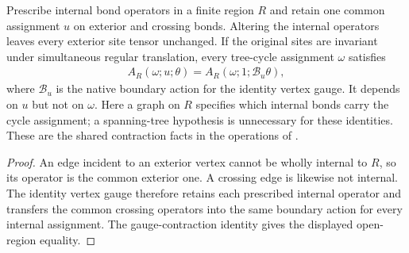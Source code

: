 \begin{lemma}%
    \label{lem:peps_regular_bond_extension_transport}
    \leanok
    Prescribe internal bond operators in a finite region $R$ and retain one
    common assignment $u$ on exterior and crossing bonds. Altering the internal
    operators leaves every exterior site tensor unchanged. If the original
    sites are invariant under simultaneous regular translation, every
    tree-cycle assignment $\omega$ satisfies
    \begin{align}
        A_R(\omega;u;\theta)
        =A_R(\omega;1;\mathcal B_u\theta),
    \end{align}
    where $\mathcal B_u$ is the native boundary action for the identity
    vertex gauge. It depends on $u$ but not on $\omega$. Here a graph on $R$
    specifies which internal bonds carry the cycle assignment; a spanning-tree
    hypothesis is unnecessary for these identities. These are the shared
    contraction facts in the operations of
    \cite[Theorems~6.16--6.17]{Schuch2010PEPS}.
\end{lemma}

\begin{proof}\leanok
    An edge incident to an exterior vertex cannot be wholly internal to $R$,
    so its operator is the common exterior one. A crossing edge is likewise
    not internal. The identity vertex gauge therefore retains each prescribed
    internal operator and transfers the common crossing operators into
    the same boundary action for every internal assignment. The
    gauge-contraction identity gives the displayed open-region equality.
\end{proof}

